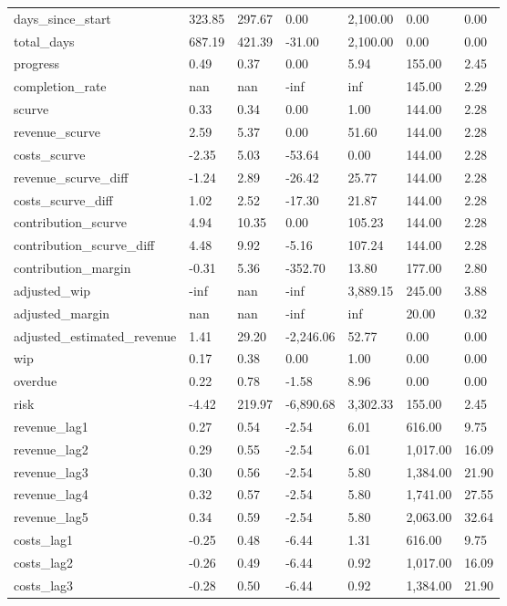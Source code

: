 \begin{landscape}
\begin{longtable}[h!]{lllllll}
days_since_start & 323.85 & 297.67 & 0.00 & 2,100.00 & 0.00 & 0.00 \\
total_days & 687.19 & 421.39 & -31.00 & 2,100.00 & 0.00 & 0.00 \\
progress & 0.49 & 0.37 & 0.00 & 5.94 & 155.00 & 2.45 \\
completion_rate & nan & nan & -inf & inf & 145.00 & 2.29 \\
scurve & 0.33 & 0.34 & 0.00 & 1.00 & 144.00 & 2.28 \\
revenue_scurve & 2.59 & 5.37 & 0.00 & 51.60 & 144.00 & 2.28 \\
costs_scurve & -2.35 & 5.03 & -53.64 & 0.00 & 144.00 & 2.28 \\
revenue_scurve_diff & -1.24 & 2.89 & -26.42 & 25.77 & 144.00 & 2.28 \\
costs_scurve_diff & 1.02 & 2.52 & -17.30 & 21.87 & 144.00 & 2.28 \\
contribution_scurve & 4.94 & 10.35 & 0.00 & 105.23 & 144.00 & 2.28 \\
contribution_scurve_diff & 4.48 & 9.92 & -5.16 & 107.24 & 144.00 & 2.28 \\
contribution_margin & -0.31 & 5.36 & -352.70 & 13.80 & 177.00 & 2.80 \\
adjusted_wip & -inf & nan & -inf & 3,889.15 & 245.00 & 3.88 \\
adjusted_margin & nan & nan & -inf & inf & 20.00 & 0.32 \\
adjusted_estimated_revenue & 1.41 & 29.20 & -2,246.06 & 52.77 & 0.00 & 0.00 \\
wip & 0.17 & 0.38 & 0.00 & 1.00 & 0.00 & 0.00 \\
overdue & 0.22 & 0.78 & -1.58 & 8.96 & 0.00 & 0.00 \\
risk & -4.42 & 219.97 & -6,890.68 & 3,302.33 & 155.00 & 2.45 \\
revenue_lag1 & 0.27 & 0.54 & -2.54 & 6.01 & 616.00 & 9.75 \\
revenue_lag2 & 0.29 & 0.55 & -2.54 & 6.01 & 1,017.00 & 16.09 \\
revenue_lag3 & 0.30 & 0.56 & -2.54 & 5.80 & 1,384.00 & 21.90 \\
revenue_lag4 & 0.32 & 0.57 & -2.54 & 5.80 & 1,741.00 & 27.55 \\
revenue_lag5 & 0.34 & 0.59 & -2.54 & 5.80 & 2,063.00 & 32.64 \\
costs_lag1 & -0.25 & 0.48 & -6.44 & 1.31 & 616.00 & 9.75 \\
costs_lag2 & -0.26 & 0.49 & -6.44 & 0.92 & 1,017.00 & 16.09 \\
costs_lag3 & -0.28 & 0.50 & -6.44 & 0.92 & 1,384.00 & 21.90 \\

\end{longtable}
\end{landscape}
